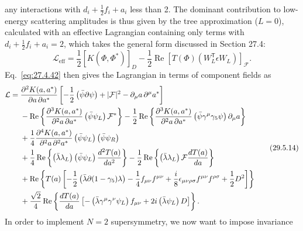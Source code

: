 any interactions with \(d_i+\tfrac12f_i+a_i\) less than 2. The dominant
contribution to low-energy scattering amplitudes is thus given by the tree
approximation (\(L=0\)), calculated with an effective Lagrangian containing
only terms with \(d_i+\tfrac12f_i+a_i=2\), which takes the general form
discussed in Section 27.4:
\begin{equation}
  \mathcal{L}_{\mathrm{eff}}
  =\frac12\left[K(\Phi,\Phi^*)\right]_D
  -\frac12\operatorname{Re}
    \left[T(\Phi)\left(W_L^{\mathsf T}\epsilon W_L\right)\right]_{\mathcal F}.
  \tag{29.5.13}\label{eq:29.5.13}
\end{equation}
Eq.~\eqref{eq:27.4.42} then gives the Lagrangian in terms of component
fields as
\begin{equation}
  \begin{aligned}
  \mathcal{L}
  ={}&
  \frac{\partial^2K(a,a^*)}{\partial a\,\partial a^*}
  \left[
    -\frac12\left(\bar\psi\sl{\partial}\psi\right)
    +\lvert\mathcal{F}\rvert^2
    -\partial_\mu a\,\partial^\mu a^*
  \right]
  \\
  &-\operatorname{Re}\left\{
    \frac{\partial^3K(a,a^*)}{\partial^2a\,\partial a^*}
    \left(\bar\psi\psi_L\right)\mathcal{F}^*
  \right\}
  -\frac12\operatorname{Re}\left\{
    \frac{\partial^3K(a,a^*)}{\partial^2a\,\partial a^*}
    \left(\bar\psi\gamma^\mu\gamma_5\psi\right)\partial_\mu a
  \right\}
  \\
  &+\frac14
    \frac{\partial^4K(a,a^*)}{\partial^2a\,\partial^2a^*}
    \left(\bar\psi\psi_L\right)\left(\bar\psi\psi_R\right)
  \\
  &+\frac14\operatorname{Re}\left\{
    \left(\bar\lambda\lambda_L\right)
    \left(\bar\psi\psi_L\right)\frac{d^2T(a)}{da^2}
  \right\}
  -\frac12\operatorname{Re}\left\{
    \left(\bar\lambda\lambda_L\right)\mathcal{F}\frac{dT(a)}{da}
  \right\}
  \\
  &+\operatorname{Re}\left\{
    T(a)\left[
      -\frac12\left(\bar\lambda\sl{\partial}(1-\gamma_5)\lambda\right)
      -\frac14f_{\mu\nu}f^{\mu\nu}
      +\frac{i}{8}\epsilon_{\mu\nu\rho\sigma}
        f^{\mu\nu}f^{\rho\sigma}
      +\frac12D^2
    \right]
  \right\}
  \\
  &+\frac{\sqrt{2}}{4}\operatorname{Re}\left\{
    \frac{dT(a)}{da}\left[
      -\left(\bar\lambda\gamma^\mu\gamma^\nu\psi_L\right)f_{\mu\nu}
      +2i\left(\bar\lambda\psi_L\right)D
    \right]
  \right\}.
  \end{aligned}
  \tag{29.5.14}\label{eq:29.5.14}
\end{equation}
In order to implement \(N=2\) supersymmetry, we now want to impose invariance
